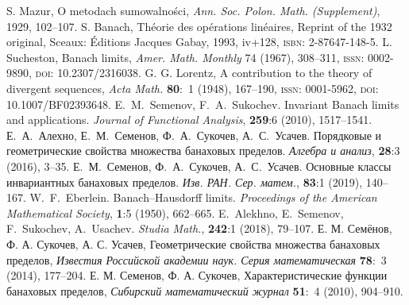 \documentclass[a4paper,14pt]{article}
\begin{document}
	\small
	\begin{thebibliography}{99}
		{}
		S. Mazur, O metodach sumowalno\'sci,
		\emph{Ann. Soc. Polon. Math. (Supplement)}, 1929, 102--107.
		{}
		S. Banach, Th\'eorie des op\'erations lin\'eaires, Reprint of the 1932 original, Sceaux: \'Editions Jacques Gabay,
		1993, iv+128, \textsc{isbn}: 2-87647-148-5.
		{}
		L. Sucheston, Banach limits, \emph{Amer. Math. Monthly} 74 (1967), 308--311, \textsc{issn}: 0002-9890,
		\textsc{doi}: {10.2307/2316038}.
		{}
		G. G. Lorentz, A contribution to the theory of divergent sequences, \emph{Acta Math.} \textbf{80}:~{1}
		(1948), 167--190, \textsc{issn}: 0001-5962, \textsc{doi}: {10.1007/BF02393648}.
		{}
		E.~M.~Semenov, F.~A.~Sukochev. Invariant Banach limits
		and applications. {\it Journal of Functional Analysis}, {\bf 259}:6 (2010), 1517--1541.
		{}
		Е.~А.~Алехно, Е.~М.~Семенов, Ф.~А.~Сукочев, А.~С.~Усачев. Порядковые и геометрические
		свойства множества банаховых пределов. {\it Алгебра и анализ}, {\bf 28}:3 (2016), 3--35.
		{}
		Е.~М.~Семенов, Ф.~А.~Сукочев, А.~С.~Усачев. Основные классы
		инвариантных банаховых пределов. {\it Изв. РАН. Сер. матем.}, {\bf 83}:1 (2019), 140--167.
		{}
		W.~F.~Eberlein. Banach--Hausdorff limits. {\it Proceedings of the
		American Mathematical Society}, {\bf 1}:5 (1950), 662--665.
		{}
		E.~Alekhno, E.~Semenov, F.~Sukochev, A.~Usachev. {\it Studia Math.}, {\bf 242}:1 (2018), 79--107.
		{}
		Е. М. Семёнов, Ф. А. Сукочев, А. С. Усачев, Геометрические свойства множества банаховых пределов,
		\emph{Известия Российской академии наук. Серия математическая} \textbf{78}:~{3} (2014), 177--204.
		{}
		Е. М. Семенов, Ф. А. Сукочев, Характеристические функции банаховых пределов, \emph{Сибирский
			математический журнал} \textbf{51}:~4 (2010), 904--910.
	\end{thebibliography}
	\normalsize
\end{document}
